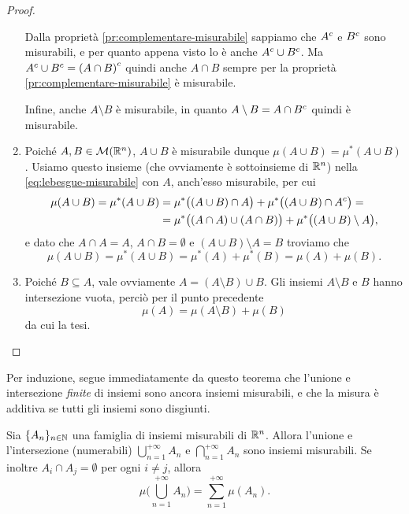 \begin{proof}
\begin{enumerate}
			Dalla proprietà \ref{pr:complementare-misurabile} sappiamo che ${A}^c$ e ${B}^c$ sono misurabili, e per quanto appena visto lo è anche ${A}^c\cup{B}^c$.
			Ma ${A}^c\cup{B}^c={(A\cap B)}^c$ quindi anche $A\cap B$ sempre per la proprietà \ref{pr:complementare-misurabile} è misurabile.

			Infine, anche $A\setminus B$ è misurabile, in quanto $A\setminus B=A\cap{B}^c$ quindi è misurabile.
		\item Poich\'e $A,B\in\mathcal M(\mathbb{R}^n)$, $A\cup B$ è misurabile dunque $\mu(A\cup B)=\mu^*(A\cup B)$.
			Usiamo questo insieme (che ovviamente è sottoinsieme di $\mathbb{R}^n$) nella \eqref{eq:lebesgue-misurabile} con $A$, anch'esso misurabile, per cui
			\begin{equation}
				\begin{split}
					\mu(A\cup B)=\mu^*(A\cup B)&=\mu^*\big((A\cup B)\cap A\big)+\mu^*\big((A\cup B)\cap{A}^c\big)=\\
					&=\mu^*\big((A\cap A)\cup(A\cap B)\big)+\mu^*\big((A\cup B)\setminus A\big),
				\end{split}
			\end{equation}
			e dato che $A\cap A=A$, $A\cap B=\emptyset$ e $(A\cup B)\setminus A=B$ troviamo che
			\begin{equation}
				\mu(A\cup B)=\mu^*(A\cup B)=\mu^*(A)+\mu^*(B)=\mu(A)+\mu(B).
			\end{equation}
		\item Poich\'e $B\subseteq A$, vale ovviamente $A=(A\setminus B)\cup B$.
			Gli insiemi $A\setminus B$ e $B$ hanno intersezione vuota, perciò per il punto precedente
			\begin{equation}
				\mu(A)=\mu(A\setminus B)+\mu(B)
			\end{equation}
			da cui la tesi.\qedhere
	\end{enumerate}
\end{proof}
Per induzione, segue immediatamente da questo teorema che l'unione e intersezione \emph{finite} di insiemi sono ancora insiemi misurabili, e che la misura è additiva se tutti gli insiemi sono disgiunti.
\begin{proprieta} \label{pr:additivita-numerabile-lebesgue}
	Sia $\{A_n\}_{n\in\mathbb{N}}$ una famiglia di insiemi misurabili di $\mathbb{R}^n$.
	Allora l'unione e l'intersezione (numerabili) $\bigcup_{n=1}^{+\infty}A_n$ e $\bigcap_{n=1}^{+\infty}A_n$ sono insiemi misurabili.
	Se inoltre $A_i\cap A_j=\emptyset$ per ogni $i\neq j$, allora
	\begin{equation}
		\mu\bigg(\bigcup_{n=1}^{+\infty}A_n\bigg)=\sum_{n=1}^{+\infty}\mu(A_n).
		\label{eq:additivita-numerabile-lebesgue}
	\end{equation}
\end{proprieta}

